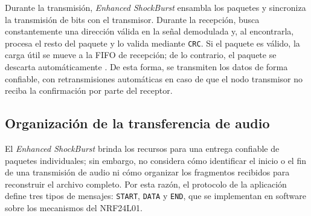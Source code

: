 Durante la transmisión, \textit{Enhanced ShockBurst} ensambla los paquetes y sincroniza la transmisión de bits con el transmisor.
Durante la recepción, busca constantemente una dirección válida en la señal demodulada y, al encontrarla, procesa el resto del paquete y lo valida mediante \texttt{CRC}.
Si el paquete es válido, la carga útil se mueve a la FIFO de recepción; de lo contrario, el paquete se descarta automáticamente \cite{nordic}.
De esta forma, se transmiten los datos de forma confiable, con retransmisiones automáticas en caso de que el nodo transmisor no reciba la confirmación por parte del receptor.

\subsection{Organización de la transferencia de audio} \label{sec:organizacion_transferencia}

El \textit{Enhanced ShockBurst} brinda los recursos para una entrega confiable de paquetes individuales; sin embargo, no considera cómo identificar el inicio o el fin de una transmisión de audio ni cómo organizar los fragmentos recibidos para reconstruir el archivo completo.
Por esta razón, el protocolo de la aplicación define tres tipos de mensajes: \texttt{START}, \texttt{DATA} y \texttt{END}, que se implementan en software sobre los mecanismos del NRF24L01.

